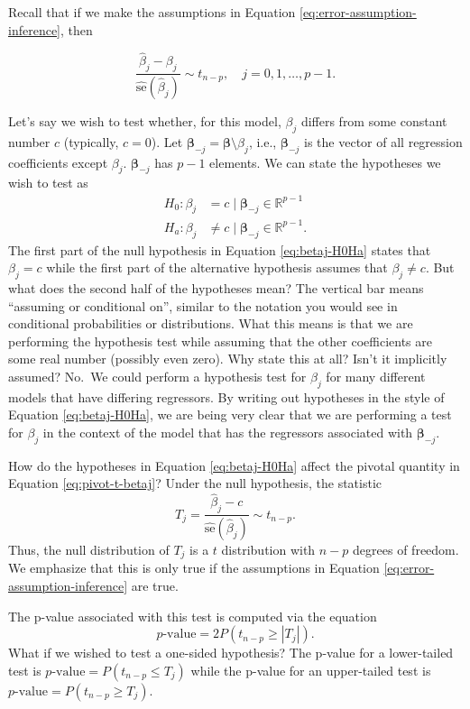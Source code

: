 \documentclass[
]{book}
\theoremstyle{definition}
\theoremstyle{definition}
\theoremstyle{definition}
\theoremstyle{definition}
\theoremstyle{remark}
\begin{document}
Recall that if we make the assumptions in Equation
\eqref{eq:error-assumption-inference}, then

\begin{equation}
\frac{\hat{\beta}_j-\beta_j}{\hat{\mathrm{se}}(\hat{\beta}_j)}\sim t_{n-p}, \quad j=0,1,\ldots,p-1. \label{eq:pivot-t-betaj}
\end{equation}

Let's say we wish to test whether, for this model, \(\beta_j\) differs from some constant number \(c\) (typically, \(c=0\)). Let \(\boldsymbol{\beta}_{-j}=\boldsymbol{\beta}\setminus{\beta_j}\), i.e., \(\boldsymbol{\beta}_{-j}\) is the vector of all regression coefficients except \(\beta_j\). \(\boldsymbol{\beta}_{-j}\) has \(p-1\) elements. We can state the hypotheses we wish to test as
\[
\begin{aligned}
H_0: \beta_j &= c \mid \boldsymbol{\beta}_{-j}\in\mathbb{R}^{p-1} \\
H_a: \beta_j &\neq c \mid \boldsymbol{\beta}_{-j}\in\mathbb{R}^{p-1}.
\end{aligned}
\label{eq:betaj-H0Ha}
\]
The first part of the null hypothesis in Equation \eqref{eq:betaj-H0Ha} states that \(\beta_j = c\) while the first part of the alternative hypothesis assumes that \(\beta_j \neq c\). But what does the second half of the hypotheses mean? The vertical bar means ``assuming or conditional on'', similar to the notation you would see in conditional probabilities or distributions. What this means is that we are performing the hypothesis test while assuming that the other coefficients are some real number (possibly even zero). Why state this at all? Isn't it implicitly assumed? No.~We could perform a hypothesis test for \(\beta_j\) for many different models that have differing regressors. By writing out hypotheses in the style of Equation \eqref{eq:betaj-H0Ha}, we are being very clear that we are performing a test for \(\beta_j\) in the context of the model that has the regressors associated with \(\boldsymbol{\beta}_{-j}\).

How do the hypotheses in Equation \eqref{eq:betaj-H0Ha} affect the pivotal quantity in Equation \eqref{eq:pivot-t-betaj}? Under the null hypothesis, the statistic
\[
T_j = \frac{\hat{\beta}_j-c}{\hat{\mathrm{se}}(\hat{\beta}_j)} \sim t_{n-p}.
\]
Thus, the null distribution of \(T_j\) is a \(t\) distribution with \(n-p\) degrees of freedom. We emphasize that this is only true if the assumptions in Equation
\eqref{eq:error-assumption-inference} are true.

The p-value associated with this test is computed via the equation
\[
p\text{-value} = 2P(t_{n-p}\geq |T_j|).
\]
What if we wished to test a one-sided hypothesis? The p-value for a lower-tailed test is \(p\text{-value}=P(t_{n-p}\leq T_j)\) while the p-value for an upper-tailed test is \(p\text{-value}=P(t_{n-p}\geq T_j)\).
\end{document}
